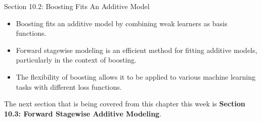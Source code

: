 \begin{notes}{Section 10.2: Boosting Fits An Additive Model}
    \begin{highlight}
        \begin{itemize}
            \item Boosting fits an additive model by combining weak learners as basis functions.
            \item Forward stagewise modeling is an efficient method for fitting additive models, particularly in the context of boosting.
            \item The flexibility of boosting allows it to be applied to various machine learning tasks with different loss functions.
        \end{itemize}
    \end{highlight}
\end{notes}

The next section that is being covered from this chapter this week is \textbf{Section 10.3: Forward Stagewise Additive Modeling}.

